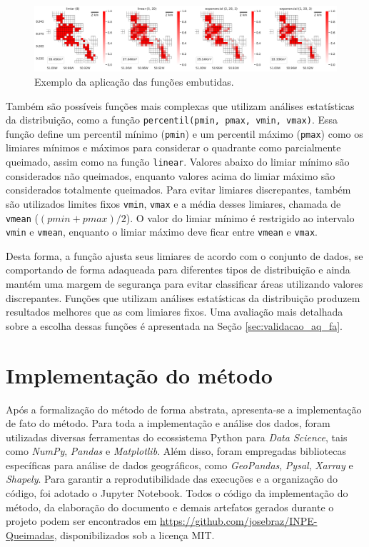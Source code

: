 \documentclass[cic,tc]{iiufrgs}
\begin{document}
\begin{figure}[!htb]
    \caption{Exemplo da aplicação das funções embutidas.}
    \begin{center}
        \includegraphics[width=35em]{aplicacao_funcoes_built_in}
    \end{center}
    \label{fig:aplicacao_funcoes_built_in}
\end{figure}

Também são possíveis funções mais complexas que utilizam análises estatísticas da distribuição, como a função \texttt{percentil(pmin, pmax, vmin, vmax)}. Essa função define um percentil mínimo (\texttt{pmin}) e um percentil máximo (\texttt{pmax}) como os limiares mínimos e máximos para considerar o quadrante como parcialmente queimado, assim como na função \texttt{linear}. Valores abaixo do limiar mínimo são considerados não queimados, enquanto valores acima do limiar máximo são considerados totalmente queimados. Para evitar limiares discrepantes, também são utilizados limites fixos \texttt{vmin}, \texttt{vmax} e a média desses limiares, chamada de \texttt{vmean} ($(pmin + pmax) / 2$). O valor do limiar mínimo é restrigido ao intervalo \texttt{vmin} e \texttt{vmean}, enquanto o limiar máximo deve ficar entre \texttt{vmean} e \texttt{vmax}. 

Desta forma, a função ajusta seus limiares de acordo com o conjunto de dados, se comportando de forma adaqueada para diferentes tipos de distribuição e ainda mantém uma margem de segurança para evitar classificar áreas utilizando valores discrepantes. Funções que utilizam análises estatísticas da distribuição produzem resultados melhores que as com limiares fixos. Uma avaliação mais detalhada sobre a escolha dessas funções é apresentada na Seção \ref{sec:validacao_aq_fa}.

\section{Implementação do método}
\label{sec:implementacao_metodo}

Após a formalização do método de forma abstrata, apresenta-se a
implementação de fato do método.
%
Para toda a implementação e análise dos dados, foram utilizadas diversas ferramentas do ecossistema Python para \textit{Data Science}, tais como \textit{NumPy}, \textit{Pandas} e \textit{Matplotlib}. Além disso, foram empregadas bibliotecas específicas para análise de dados geográficos, como \textit{GeoPandas}, \textit{Pysal}, \textit{Xarray} e \textit{Shapely}. Para garantir a reprodutibilidade das execuções e a organização do código, foi adotado o Jupyter Notebook. Todos o código da implementação do método, da elaboração do documento e demais artefatos gerados durante o projeto podem ser encontrados em \url{https://github.com/josebraz/INPE-Queimadas}, disponibilizados sob a licença MIT.
\end{document}

